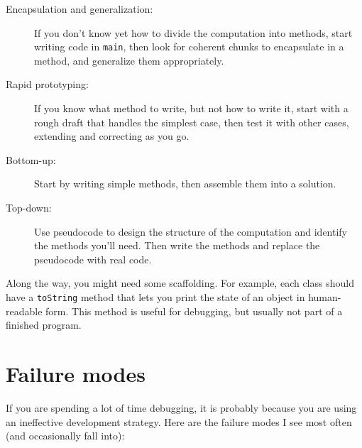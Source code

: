 \begin{description}

\item[Encapsulation and generalization:] If you don't know yet how
to divide the computation into methods, start writing code in
{\tt main}, then look for coherent chunks to encapsulate in
a method, and generalize them appropriately.

\item[Rapid prototyping:] If you know what method to write, but not
how to write it, start with a rough draft that handles the simplest
case, then test it with other cases, extending and correcting as you go.

\item[Bottom-up:] Start by writing simple methods, then assemble them
into a solution.

\item[Top-down:] Use pseudocode to design the structure of the
computation and identify the methods you'll need.  Then write the
methods and replace the pseudocode with real code.

\end{description}

Along the way, you might need some scaffolding. For example, each
class should have a {\tt toString} method that lets you print the
state of an object in human-readable form.  This method is useful
for debugging, but usually not part of a finished program.

\section{Failure modes}

If you are spending a lot of time debugging, it is probably
because you are using an ineffective development strategy.  Here
are the failure modes I see most often (and occasionally fall into):

